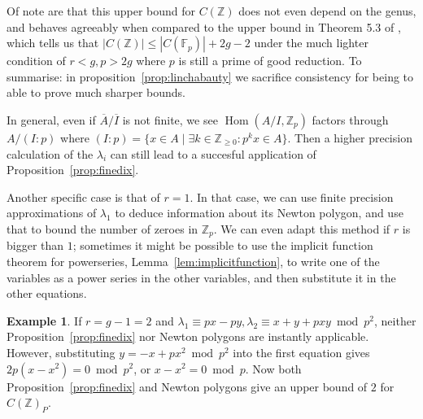 \documentclass[12pt]{article}
\newcommand{\Z}{\mathbb{Z}}
\newcommand{\F}{\mathbb{F}}
\DeclareMathOperator{\Hom}{Hom}
\theoremstyle{plain}
\theoremstyle{definition}
\newtheorem{exmp}[thm]{Example} %
\theoremstyle{remark}
\begin{document}
Of note are that this upper bound for $C(\Z)$ does not even depend on the genus, and behaves agreeably when compared to the upper bound in Theorem 5.3 of \citep{poonen12}, which tells us that $|C(\Z)| \leq |C(\F_p)| + 2g-2$ under the much lighter condition of $r < g, p > 2g$ where $p$ is still a prime of good reduction. To summarise: in proposition~\ref{prop:linchabauty} we sacrifice consistency for being to able to prove much sharper bounds. 

In general, even if $\overline{A}/\overline{I}$ is not finite, we see $\Hom(A/I,\Z_p)$ factors through $A/(I:p)$ where $(I:p) = \{x \in A \mid \exists k \in \Z_{\geq 0}: p^kx \in A\}$. Then a higher precision calculation of the $\lambda_i$ can still lead to a succesful application of Proposition~\ref{prop:finedix}.

Another specific case is that of $r = 1$. In that case, we can use finite precision approximations of $\lambda_1$ to deduce information about its Newton polygon, and use that to bound the number of zeroes in $\Z_p$. We can even adapt this method if $r$ is bigger than $1$; sometimes it might be possible to use the implicit function theorem for powerseries, Lemma~\ref{lem:implicitfunction}, to write one of the variables as a power series in the other variables, and then substitute it in the other equations.

\begin{exmp}
If $r = g-1 = 2$ and $\lambda_1 \equiv px-py,\lambda_2 \equiv x+y+pxy \bmod p^2$, neither Proposition~\ref{prop:finedix} nor Newton polygons are instantly applicable. However, substituting $y = -x +px^2 \bmod p^2$ into the first equation gives $2p(x-x^2) = 0 \bmod p^2$, or $x-x^2 = 0\bmod p$. Now both Proposition~\ref{prop:finedix} and Newton polygons give an upper bound of $2$ for $C(\Z)_P$.
\end{exmp}
\end{document}

